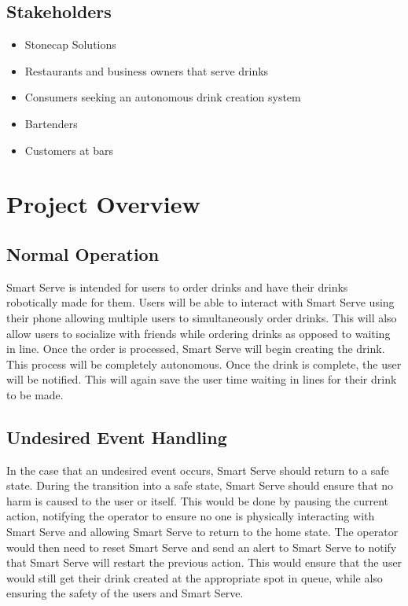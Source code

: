 \documentclass{article}
\begin{document}
\subsection{Stakeholders}
    \begin{itemize}
        \item Stonecap Solutions
        \item Restaurants and business owners that serve drinks
        \item Consumers seeking an autonomous drink creation system
        \item Bartenders
        \item Customers at bars
    \end{itemize}

\section{Project Overview}
\subsection{Normal Operation}
    Smart Serve is intended for users to order drinks and have their drinks robotically made for them. Users will be able to interact with Smart Serve using their phone allowing multiple users to simultaneously order drinks. This will also allow users to socialize with friends while ordering drinks as opposed to waiting in line. Once the order is processed, Smart Serve will begin creating the drink. This process will be completely autonomous. Once the drink is complete, the user will be notified. This will again save the user time waiting in lines for their drink to be made.

\subsection{Undesired Event Handling}
    In the case that an undesired event occurs, Smart Serve should return to a safe state. During the transition into a safe state, Smart Serve should ensure that no harm is caused to the user or itself. This would be done by pausing the current action, notifying the operator to ensure no one is physically interacting with Smart Serve and allowing Smart Serve to return to the home state. The operator would then need to reset Smart Serve and send an alert to Smart Serve to notify that Smart Serve will restart the previous action. This would ensure that the user would still get their drink created at the appropriate spot in queue, while also ensuring the safety of the users and Smart Serve.
\end{document}
